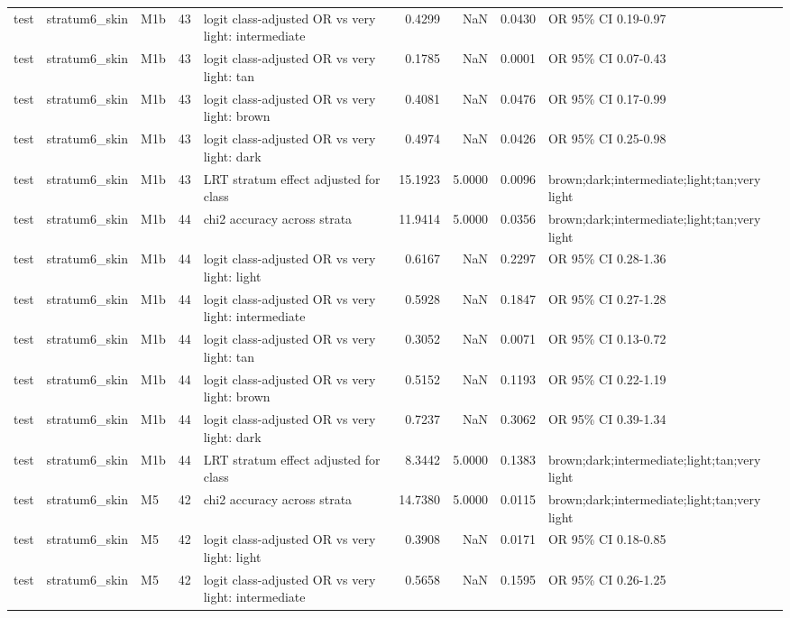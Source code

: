 \begin{tabular}{lllrlrrrl}
test & stratum6\_skin & M1b & 43 & logit class-adjusted OR vs very light: intermediate & 0.4299 & NaN & 0.0430 & OR 95\% CI 0.19-0.97 \\
test & stratum6\_skin & M1b & 43 & logit class-adjusted OR vs very light: tan & 0.1785 & NaN & 0.0001 & OR 95\% CI 0.07-0.43 \\
test & stratum6\_skin & M1b & 43 & logit class-adjusted OR vs very light: brown & 0.4081 & NaN & 0.0476 & OR 95\% CI 0.17-0.99 \\
test & stratum6\_skin & M1b & 43 & logit class-adjusted OR vs very light: dark & 0.4974 & NaN & 0.0426 & OR 95\% CI 0.25-0.98 \\
test & stratum6\_skin & M1b & 43 & LRT stratum effect adjusted for class & 15.1923 & 5.0000 & 0.0096 & brown;dark;intermediate;light;tan;very light \\
test & stratum6\_skin & M1b & 44 & chi2 accuracy across strata & 11.9414 & 5.0000 & 0.0356 & brown;dark;intermediate;light;tan;very light \\
test & stratum6\_skin & M1b & 44 & logit class-adjusted OR vs very light: light & 0.6167 & NaN & 0.2297 & OR 95\% CI 0.28-1.36 \\
test & stratum6\_skin & M1b & 44 & logit class-adjusted OR vs very light: intermediate & 0.5928 & NaN & 0.1847 & OR 95\% CI 0.27-1.28 \\
test & stratum6\_skin & M1b & 44 & logit class-adjusted OR vs very light: tan & 0.3052 & NaN & 0.0071 & OR 95\% CI 0.13-0.72 \\
test & stratum6\_skin & M1b & 44 & logit class-adjusted OR vs very light: brown & 0.5152 & NaN & 0.1193 & OR 95\% CI 0.22-1.19 \\
test & stratum6\_skin & M1b & 44 & logit class-adjusted OR vs very light: dark & 0.7237 & NaN & 0.3062 & OR 95\% CI 0.39-1.34 \\
test & stratum6\_skin & M1b & 44 & LRT stratum effect adjusted for class & 8.3442 & 5.0000 & 0.1383 & brown;dark;intermediate;light;tan;very light \\
test & stratum6\_skin & M5 & 42 & chi2 accuracy across strata & 14.7380 & 5.0000 & 0.0115 & brown;dark;intermediate;light;tan;very light \\
test & stratum6\_skin & M5 & 42 & logit class-adjusted OR vs very light: light & 0.3908 & NaN & 0.0171 & OR 95\% CI 0.18-0.85 \\
test & stratum6\_skin & M5 & 42 & logit class-adjusted OR vs very light: intermediate & 0.5658 & NaN & 0.1595 & OR 95\% CI 0.26-1.25 \\

\end{tabular}
